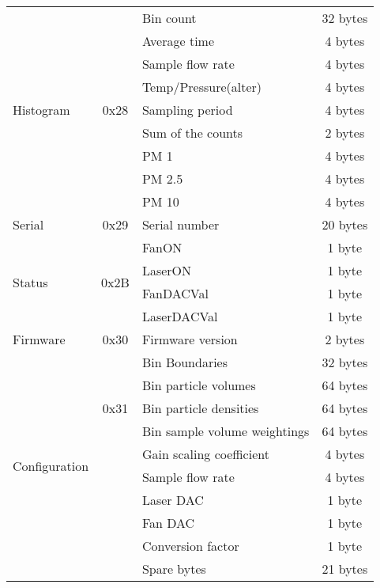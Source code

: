\begin{center}
\begin{longtable}{|l|c|>{\centering}p{}|c|}
     \rowcolor{black!8} \multicolumn{4}{|c|}{{Alpha Sensor}} \\ \hline
        \multirow{9}{*}{Histogram} & \multirow{9}{*}{0x28} & Bin count & 32 bytes \\ \cline{3-4}
        & & Average time & 4 bytes \\ \cline{3-4}
        & & Sample flow rate & 4 bytes \\ \cline{3-4}
        & & Temp/Pressure(alter) & 4 bytes\\ \cline{3-4}
        & & Sampling period & 4 bytes \\ \cline{3-4}
        & & Sum of the counts & 2 bytes \\ \cline{3-4}
        & & PM 1 & 4 bytes \\ \cline{3-4}
        & & PM 2.5 & 4 bytes \\ \cline{3-4}
        & & PM 10 & 4 bytes \\ \hline
        Serial & 0x29 & Serial number & 20 bytes \\ \hline
        \multirow{4}{*}{Status} & \multirow{4}{*}{0x2B} & FanON & 1 byte \\ \cline{3-4}
        & & LaserON & 1 byte \\ \cline{3-4}
        & & FanDACVal & 1 byte \\ \cline{3-4}
        & & LaserDACVal & 1 byte \\ \hline
        Firmware & 0x30 & Firmware version & 2 bytes \\ \hline
        \multirow{10}{*}{Configuration} & \multirow{5}{*}{0x31} & Bin Boundaries & 32 bytes \\ \cline{3-4}
        & & Bin particle volumes & 64 bytes \\ \cline{3-4}
        & & Bin particle densities & 64 bytes \\ \cline{3-4}
        & & Bin sample volume weightings & 64 bytes \\ \cline{3-4}
        & & Gain scaling coefficient & 4 bytes \\ \cline{3-4}
        & & Sample flow rate & 4 bytes \\ \cline{3-4}
        & & Laser DAC & 1 byte \\ \cline{3-4}
        & & Fan DAC & 1 byte \\ \cline{3-4}
        & & Conversion factor & 1 byte \\ \cline{3-4}
        & & Spare bytes & 21 bytes \\ 

\end{longtable}
\end{center}


